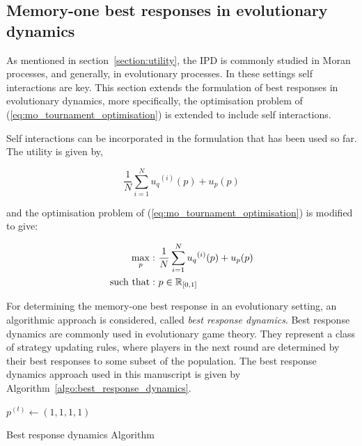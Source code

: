 \subsection{Memory-one best responses in evolutionary dynamics}\label{subsection:best_respnse_evolutionary_setting}

As mentioned in section~\ref{section:utility}, the IPD is commonly studied in
Moran processes, and generally, in evolutionary processes. In these settings self
interactions are key. This section extends the formulation of best responses
in evolutionary dynamics, more specifically, the optimisation problem of
(\ref{eq:mo_tournament_optimisation}) is extended to
include self interactions.

Self interactions can be incorporated in the formulation
that has been used so far. The utility is given by,

\begin{equation}
    \frac{1}{N} \sum\limits_{i=1} ^ {N} {u_q}^{(i)} (p) + u_p(p)
\end{equation}

and the optimisation problem of (\ref{eq:mo_tournament_optimisation}) is modified to give:

\begin{equation}\label{eq:mo_evolutionary_optimisation}
    \begin{aligned}
    \max_p: & \ \frac{1}{N} \sum\limits_{i=1} ^ {N} {u_q}^{(i)} (p) + u_p(p)
    \\
    \text{such that}: & \ p \in \mathbb{R}_{[0, 1]}
    \end{aligned}
\end{equation}

For determining the memory-one best response in an evolutionary setting,
an algorithmic approach is considered, called \textit{best
response dynamics}. Best response dynamics are commonly used in evolutionary
game theory. They represent a class of strategy updating rules, where players in
the next round are determined by their best responses to some subset of the
population. The best response dynamics approach used in this manuscript is given by
Algorithm~\ref{algo:best_response_dynamics}.

    \begin{algorithm}[H]
        $p^{(t)}\leftarrow (1, 1, 1, 1)$\;
        \caption{Best response dynamics Algorithm}
        \label{algo:best_response_dynamics}
    \end{algorithm}


